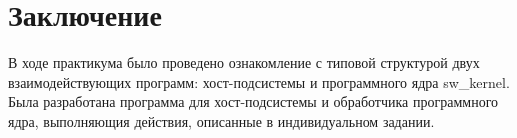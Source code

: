 \chapter*{Заключение}

В ходе практикума было проведено ознакомление с типовой структурой двух
взаимодействующих программ: хост-подсистемы и программного ядра sw\_kernel.
Была разработана программа для хост-подсистемы и обработчика программного
ядра, выполняющия действия, описанные в индивидуальном задании.
